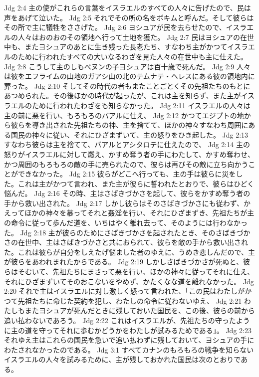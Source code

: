 Jdg 2:4  主の使がこれらの言葉をイスラエルのすべての人々に告げたので、民は声をあげて泣いた。
Jdg 2:5  それでその所の名をボキムと呼んだ。そして彼らはその所で主に犠牲をささげた。
Jdg 2:6  ヨシュアが民を去らせたので、イスラエルの人々はおのおのその領地へ行って土地を獲た。
Jdg 2:7  民はヨシュアの在世中も、またヨシュアのあとに生き残った長老たち、すなわち主がかつてイスラエルのために行われたすべての大いなるわざを見た人々の在世中も主に仕えた。
Jdg 2:8  こうして主のしもべヌンの子ヨシュアは百十歳で死んだ。
Jdg 2:9  人々は彼をエフライムの山地のガアシ山の北のテムナテ・ヘレスにある彼の領地内に葬った。
Jdg 2:10  そしてその時代の者もまたことごとくその先祖たちのもとにあつめられた。その後ほかの時代が起ったが、これは主を知らず、また主がイスラエルのために行われたわざをも知らなかった。
Jdg 2:11  イスラエルの人々は主の前に悪を行い、もろもろのバアルに仕え、
Jdg 2:12  かつてエジプトの地から彼らを導き出された先祖たちの神、主を捨てて、ほかの神々すなわち周囲にある国民の神々に従い、それにひざまずいて、主の怒りをひき起した。
Jdg 2:13  すなわち彼らは主を捨てて、バアルとアシタロテに仕えたので、
Jdg 2:14  主の怒りがイスラエルに対して燃え、かすめ奪う者の手にわたして、かすめ奪わせ、かつ周囲のもろもろの敵の手に売られたので、彼らは再びその敵に立ち向かうことができなかった。
Jdg 2:15  彼らがどこへ行っても、主の手は彼らに災をした。これは主がかつて言われ、また主が彼らに誓われたとおりで、彼らはひどく悩んだ。
Jdg 2:16  その時、主はさばきづかさを起して、彼らをかすめ奪う者の手から救い出された。
Jdg 2:17  しかし彼らはそのさばきづかさにも従わず、かえってほかの神々を慕ってそれと姦淫を行い、それにひざまずき、先祖たちが主の命令に従って歩んだ道を、いちはやく離れ去って、そのようには行わなかった。
Jdg 2:18  主が彼らのためにさばきづかさを起されたとき、そのさばきづかさの在世中、主はさばきづかさと共におられて、彼らを敵の手から救い出された。これは彼らが自分をしえたげ悩ました者のゆえに、うめき悲しんだので、主が彼らをあわれまれたからである。
Jdg 2:19  しかしさばきづかさが死ぬと、彼らはそむいて、先祖たちにまさって悪を行い、ほかの神々に従ってそれに仕え、それにひざまずいてそのおこないをやめず、かたくなな道を離れなかった。
Jdg 2:20  それで主はイスラエルに対し激しく怒って言われた、「この民はわたしがかつて先祖たちに命じた契約を犯し、わたしの命令に従わないゆえ、
Jdg 2:21  わたしもまたヨシュアが死んだときに残しておいた国民を、この後、彼らの前から追い払わないであろう。
Jdg 2:22  これはイスラエルが、先祖たちの守ったように主の道を守ってそれに歩むかどうかをわたしが試みるためである」。
Jdg 2:23  それゆえ主はこれらの国民を急いで追い払わずに残しておいて、ヨシュアの手にわたされなかったのである。
Jdg 3:1  すべてカナンのもろもろの戦争を知らないイスラエルの人々を試みるために、主が残しておかれた国民は次のとおりである。
